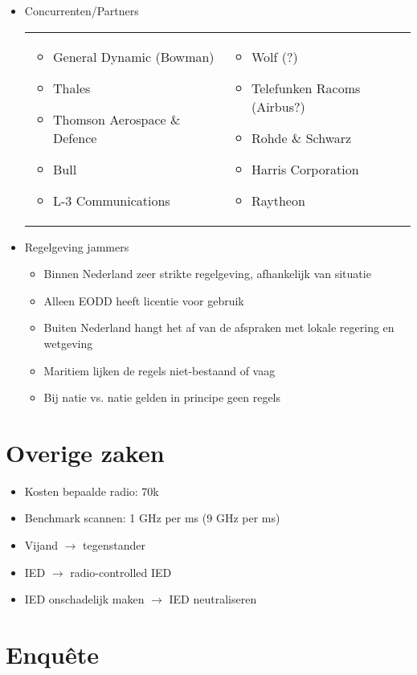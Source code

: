 \documentclass[12pt, a4paper]{article}
\begin{document}
\begin{itemize}
\begin{itemize}
        \item Concurrenten/Partners \\
        \begin{tabular}{p{}p{}}
            \begin{itemize}
                \item General Dynamic (Bowman)
                \item Thales
                \item Thomson Aerospace \& Defence
                \item Bull
                \item L-3 Communications
            \end{itemize} &

            \begin{itemize}
                \item Wolf (?)
                \item Telefunken Racoms (Airbus?)
                \item Rohde \& Schwarz
                \item Harris Corporation
                \item Raytheon
            \end{itemize} \\
        \end{tabular}

        \item Regelgeving jammers
        \begin{itemize}
            \item Binnen Nederland zeer strikte regelgeving, afhankelijk van situatie
            \item Alleen EODD heeft licentie voor gebruik
            \item Buiten Nederland hangt het af van de afspraken met lokale regering en wetgeving
            \item Maritiem lijken de regels niet-bestaand of vaag
            \item Bij natie vs. natie gelden in principe geen regels
        \end{itemize}
    \end{itemize}
\end{itemize}

\section{Overige zaken}
\begin{itemize}
    \item Kosten bepaalde radio: 70k
    \item Benchmark scannen: 1 GHz per ms (9 GHz per ms)
    \item Vijand $\rightarrow$ tegenstander
    \item IED $\rightarrow$ radio-controlled IED
    \item IED onschadelijk maken $\rightarrow$ IED neutraliseren
\end{itemize}

\section{Enquête}
\end{document}

